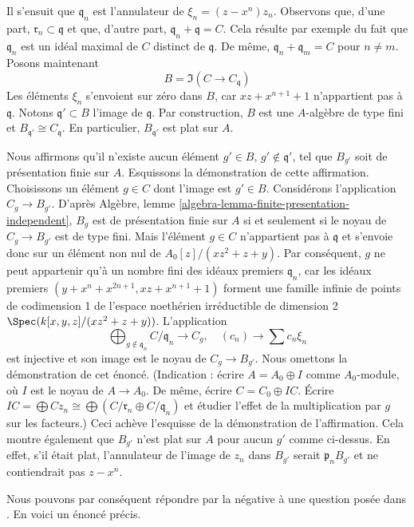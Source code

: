 Il s'ensuit que $\mathfrak q_n$ est l'annulateur de $\xi_n = (z - x^n)z_n$.
Observons que, d'une part, $\mathfrak r_n \subset \mathfrak q$ et que,
d'autre part, $\mathfrak q_n + \mathfrak q = C$. Cela résulte par exemple du fait
que $\mathfrak q_n$ est un idéal maximal de $C$ distinct de $\mathfrak q$.
De même, $\mathfrak q_n + \mathfrak q_m = C$ pour $n \not = m$.
Posons maintenant
$$
B = \Im(C \longrightarrow C_{\mathfrak q})
$$
Les éléments $\xi_n$ s'envoient sur zéro dans $B$, car $xz + x^{n + 1} + 1$
n'appartient pas à $\mathfrak q$. Notons $\mathfrak q' \subset B$ l'image de
$\mathfrak q$. Par construction, $B$ est une $A$-algèbre de type fini et
$B_{\mathfrak q'} \cong C_{\mathfrak q}$. En particulier,
$B_{\mathfrak q'}$ est plat sur $A$.

\medskip\noindent
Nous affirmons qu'il n'existe aucun élément $g' \in B$, $g' \not \in \mathfrak q'$,
tel que $B_{g'}$ soit de présentation finie sur $A$. Esquissons la démonstration de
cette affirmation. Choisissons un élément $g \in C$ dont l'image est $g' \in B$.
Considérons l'application $C_g \to B_{g'}$. D'après
Algèbre, lemme \ref{algebra-lemma-finite-presentation-independent},
$B_g$ est de présentation finie sur $A$ si et seulement si le noyau
de $C_g \to B_{g'}$ est de type fini. Mais l'élément $g \in C$
n'appartient pas à $\mathfrak q$ et s'envoie donc sur un élément non nul de
$A_0[z]/(xz^2 + z + y)$. Par conséquent, $g$ ne peut appartenir qu'à un nombre fini
des idéaux premiers $\mathfrak q_n$, car les idéaux premiers
$(y + x^n + x^{2n + 1}, xz + x^{n + 1} + 1)$ forment une famille infinie
de points de codimension 1 de l'espace noethérien irréductible de dimension 2
$\Spec(k[x, y, z]/(xz^2 + z + y))$. L'application
$$
\bigoplus\nolimits_{g \not \in \mathfrak q_n} C/\mathfrak q_n
\longrightarrow
C_g, \quad
(c_n) \longrightarrow \sum c_n \xi_n
$$
est injective et son image est le noyau de $C_g \to B_{g'}$. Nous omettons la
démonstration de cet énoncé. (Indication : écrire $A = A_0 \oplus I$ comme $A_0$-module,
où $I$ est le noyau de $A \to A_0$. De même, écrire $C = C_0 \oplus IC$.
Écrire
$IC = \bigoplus Cz_n \cong \bigoplus (C/\mathfrak r_n \oplus C/\mathfrak q_n)$
et étudier l'effet de la multiplication par $g$ sur les facteurs.)
Ceci achève l'esquisse de la démonstration de l'affirmation.
Cela montre également que $B_{g'}$ n'est plat sur $A$ pour aucun $g'$ comme ci-dessus.
En effet, s'il était plat, l'annulateur de l'image de $z_n$ dans
$B_{g'}$ serait $\mathfrak p_nB_{g'}$ et ne contiendrait pas $z - x^n$.

\medskip\noindent
Nous pouvons par conséquent répondre par la négative à une question posée dans
\cite[Part I, Remarques (3.4.7) ()]{GruRay}.
En voici un énoncé précis.

